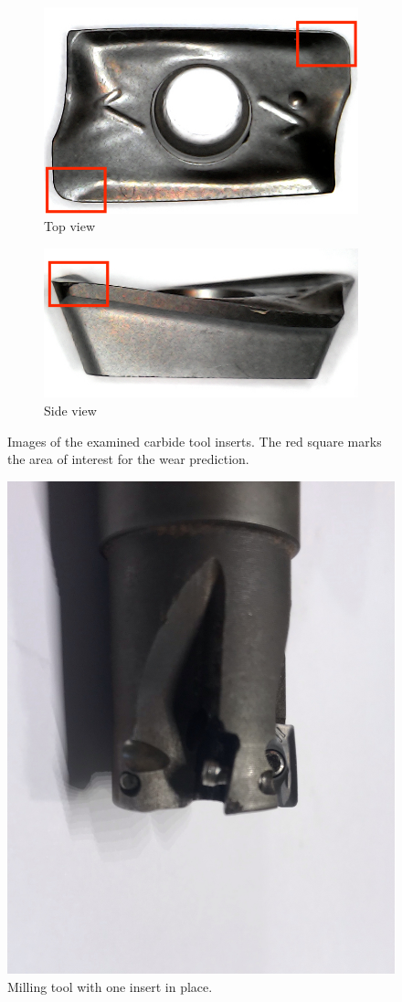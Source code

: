\begin{figure}[hbtp]
\centering
	\begin{subfigure}{0.45\textwidth}
		\includegraphics[width=\linewidth]{fig/algemeen/plaatjes/plaatje/top_view_mark.jpg} 
		\caption{Top view}
		\label{fig:gen:insert:top}
	\end{subfigure}
	\hspace*{\fill}
	\begin{subfigure}{0.45\textwidth}
		\includegraphics[width=\linewidth]{fig/algemeen/plaatjes/plaatje/side_view_mark.jpg} 
		\caption{Side view}
		\label{fig:intr:insert:side}
	\end{subfigure}
	\caption{Images of the examined carbide tool inserts. The red square marks the area of interest for the wear prediction.}
	\label{fig:intr:inserts}
\end{figure}

\begin{figure}[hbtp]
\centering
\includegraphics[width=.40\textwidth]{fig/algemeen/plaatjes/houder/rotary_holder.jpeg}
\caption{Milling tool with one insert in place.}
 \label{fig:gen:insertholder}
\end{figure}

